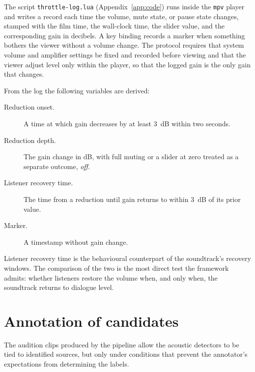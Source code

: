 The script \texttt{throttle-log.lua} (Appendix~\ref{app:code}) runs inside the \texttt{mpv} player and writes a record each time the volume, mute state, or pause state changes, stamped with the film time, the wall-clock time, the slider value, and the corresponding gain in decibels. A key binding records a marker when something bothers the viewer without a volume change. The protocol requires that system volume and amplifier settings be fixed and recorded before viewing and that the viewer adjust level only within the player, so that the logged gain is the only gain that changes.

From the log the following variables are derived:
\begin{description}
\item[Reduction onset.] A time at which gain decreases by at least 3~dB within two seconds.
\item[Reduction depth.] The gain change in dB, with full muting or a slider at zero treated as a separate outcome, \emph{off}.
\item[Listener recovery time.] The time from a reduction until gain returns to within 3~dB of its prior value.
\item[Marker.] A timestamp without gain change.
\end{description}

Listener recovery time is the behavioural counterpart of the soundtrack's recovery windows. The comparison of the two is the most direct test the framework admits: whether listeners restore the volume when, and only when, the soundtrack returns to dialogue level.

\section{Annotation of candidates}

The audition clips produced by the pipeline allow the acoustic detectors to be tied to identified sources, but only under conditions that prevent the annotator's expectations from determining the labels.

